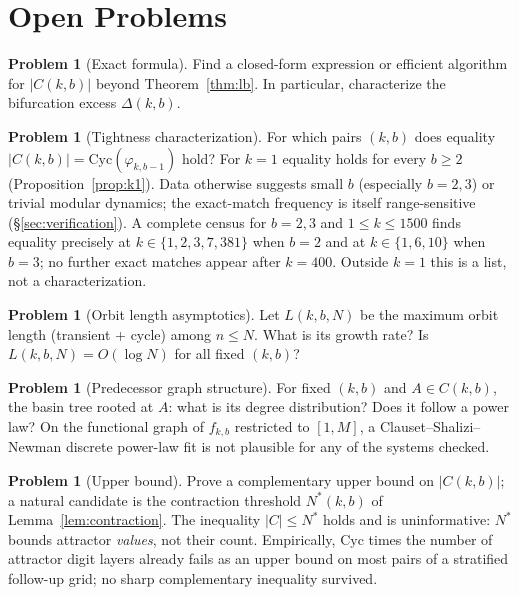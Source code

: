 \documentclass[11pt]{article}
\theoremstyle{definition}
\newtheorem{problem}[theorem]{Problem}
\theoremstyle{remark}
\newcommand{\Cyc}{\mathrm{Cyc}}
\begin{document}
\section{Open Problems}\label{sec:open}

\begin{problem}[Exact formula]
Find a closed-form expression or efficient algorithm for $|C(k,b)|$ beyond Theorem~\ref{thm:lb}. In particular, characterize the bifurcation excess $\Delta(k,b)$.
\end{problem}

\begin{problem}[Tightness characterization]\label{prob:tight}
For which pairs $(k,b)$ does equality $|C(k,b)| = \Cyc(\varphi_{k,b-1})$ hold? For $k=1$ equality holds for every $b\ge 2$ (Proposition~\ref{prop:k1}). Data otherwise suggests small $b$ (especially $b = 2,3$) or trivial modular dynamics; the exact-match frequency is itself range-sensitive (\S\ref{sec:verification}). A complete census for $b=2,3$ and $1 \le k \le 1500$ finds equality precisely at $k \in \{1,2,3,7,381\}$ when $b=2$ and at $k \in \{1,6,10\}$ when $b=3$; no further exact matches appear after $k=400$. Outside $k=1$ this is a list, not a characterization.
\end{problem}

\begin{problem}[Orbit length asymptotics]
Let $L(k,b,N)$ be the maximum orbit length (transient + cycle) among $n \le N$. What is its growth rate? Is $L(k,b,N) = O(\log N)$ for all fixed $(k,b)$?
\end{problem}

\begin{problem}[Predecessor graph structure]
For fixed $(k,b)$ and $A \in C(k,b)$, the basin tree rooted at $A$: what is its degree distribution? Does it follow a power law? On the functional graph of $f_{k,b}$ restricted to $[1,M]$, a Clauset--Shalizi--Newman discrete power-law fit is not plausible for any of the systems checked.
\end{problem}

\begin{problem}[Upper bound]
Prove a complementary upper bound on $|C(k,b)|$; a natural candidate is the contraction threshold $N^*(k,b)$ of Lemma~\ref{lem:contraction}. The inequality $|C| \le N^*$ holds and is uninformative: $N^*$ bounds attractor \emph{values}, not their count. Empirically, $\Cyc$ times the number of attractor digit layers already fails as an upper bound on most pairs of a stratified follow-up grid; no sharp complementary inequality survived.
\end{problem}
\end{document}
